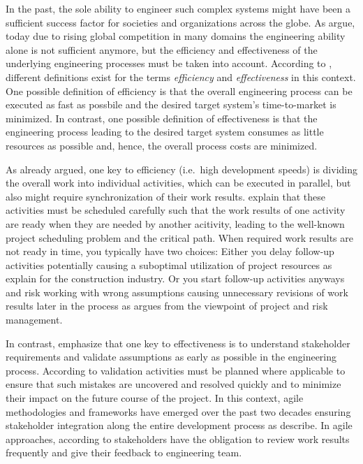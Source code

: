 \documentclass{PDS}
\begin{document}
In the past, the sole ability to engineer such complex systems might have been a sufficient success factor for societies and organizations across the globe.
As \citet{Senescu_2014} argue, today due to rising global competition in many domains the engineering ability alone is not sufficient anymore, but the efficiency and effectiveness of the underlying engineering processes must be taken into account.
According to \citet{Zidane2017}, different definitions exist for the terms \textit{efficiency} and \textit{effectiveness} in this context.
One possible definition of efficiency is that the overall engineering process can be executed as fast as possbile and the desired target system's time-to-market is minimized.
In contrast, one possible definition of effectiveness is that the engineering process leading to the desired target system consumes as little resources as possible and, hence, the overall process costs are minimized.

As \citet{Strauss_1985} already argued, one key to efficiency (i.e.\ high development speeds) is dividing the overall work into individual activities, which can be executed in parallel, but also might require synchronization of their work results.
\citet{Hartmann_2022} explain that these activities must be scheduled carefully such that the work results of one activity are ready when they are needed by another acitivity, leading to the well-known project scheduling problem and the critical path.
When required work results are not ready in time, you typically have two choices:
Either you delay follow-up activities potentially causing a suboptimal utilization of project resources as \citet{Kumaraswamy_1998} explain for the construction industry.
Or you start follow-up activities anyways and risk working with wrong assumptions causing unnecessary revisions of work results later in the process as \citet{Chapman_2006} argues from the viewpoint of project and risk management.

In contrast, \citet{Maalem_2016} emphasize that one key to effectiveness is to understand stakeholder requirements and validate assumptions as early as possible in the engineering process.
According to \citet{Mobin_2019} validation activities must be planned where applicable to ensure that such mistakes are uncovered and resolved quickly and to minimize their impact on the future course of the project.
In this context, agile methodologies and frameworks have emerged over the past two decades ensuring stakeholder integration along the entire development process as \citet{Chan_2009} describe.
In agile approaches, according to \citet{Deininger_2019} stakeholders have the obligation to review work results frequently and give their feedback to engineering team.
\end{document}
